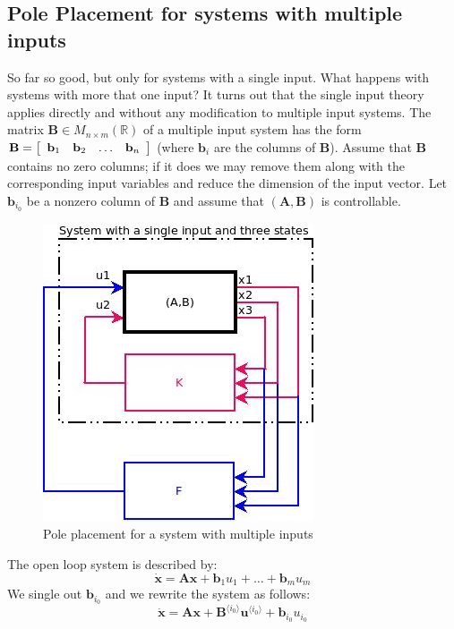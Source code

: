 \documentclass[a4paper,10pt,oneside]{book}
\begin{document}
\subsection{Pole Placement for systems with multiple inputs}
So far so good, but only for systems with a single input. 
What happens with systems with more that one input? 
It turns out that the single input theory applies directly and without any 
modification to multiple input systems. The matrix $\mathbf{B}\in M_{n\times m}(\mathbb{R})$ 
of a multiple input system has the form $\mathbf{B}=\left[ {\begin{array}{*{4}c} \mathbf{b}_1&\mathbf{b}_2&\ldots&\mathbf{b}_n \end{array} } \right]$ 
(where $\mathbf{b}_i$ are the columns of $\mathbf{B}$). 
Assume that $\mathbf{B}$ contains no zero columns; if it does we may remove them along with the corresponding input variables and reduce the dimension of the input vector.
Let $\mathbf{b}_{i_0}$ be a nonzero column of $\mathbf{B}$ and assume that 
$(\mathbf{A},\mathbf{B})$ is controllable.
\begin{figure}[here]
 \centering
 \includegraphics[scale=0.4]{./PolePlacementMI.jpg}
 \caption{Pole placement for a system with multiple inputs} 
\end{figure}
The open loop system is described by:
\begin{equation}
 \dot{\mathbf{x}}=\mathbf{Ax}+\mathbf{b}_1 u_1+\ldots+\mathbf{b}_m u_m
\end{equation}
We single out $\mathbf{b}_{i_0}$ and we rewrite the system as follows:
\begin{equation}
 \dot{\mathbf{x}}=\mathbf{Ax}+\mathbf{B}^{\langle i_0 \rangle} \mathbf{u}^{\langle i_0 \rangle}+\mathbf{b}_{i_0} u_{i_0}
\end{equation}
\end{document}
